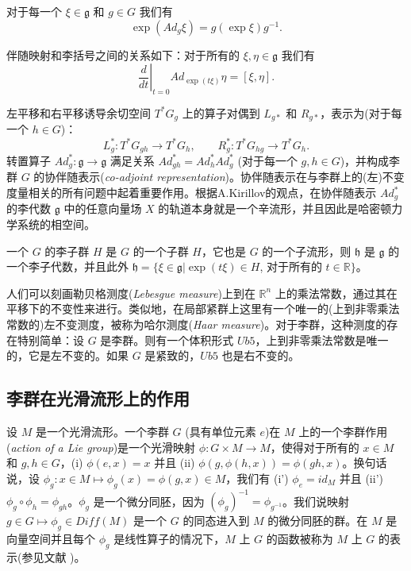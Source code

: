 \documentclass[11pt,fontset=founder]{ctexart}
\begin{document}
对于每一个 $\xi \in \mathfrak{g}$ 和 $g\in G$ 我们有
\begin{equation*}
\exp \left( Ad_{g}\xi \right) =g\left( \exp \xi \right) g^{-1}.
\end{equation*}

伴随映射和李括号之间的关系如下：对于所有的 $\xi ,\eta \in \mathfrak{g}$ 我们有
\begin{equation*}
\left. \frac{d}{dt}\right| _{t=0}Ad_{\exp (t\xi )}\eta =[\xi ,\eta ].
\end{equation*}

左平移和右平移诱导余切空间 $T^{\ast}G_{g}$ 上的算子对偶到 $L_{g\ast }$ 和 $R_{g\ast }$，表示为(对于每一个 $h\in G $)：%
\begin{equation*}
L_{g}^{\ast }:T^{\ast }G_{gh}\rightarrow T^{\ast }G_{h},\qquad R_{g}^{\ast
}:T^{\ast }G_{hg}\rightarrow T^{\ast }G_{h}.
\end{equation*}%
转置算子 $Ad_{g}^{\ast }:\mathfrak{g}\rightarrow \mathfrak{g}$ 满足关系 $Ad_{gh}^{\ast }=Ad_{h}^{\ast }Ad_{g}^{\ast }$ (对于每一个 $g,h\in G$)，并构成李群 $G$ 的协伴随表示(\textit{co-adjoint representation})。协伴随表示在与李群上的(左)不变度量相关的所有问题中起着重要作用。根据A.Kirillov的观点，在协伴随表示 $Ad_{g}^{\ast }$ 的李代数 $\mathfrak{g}$ 中的任意向量场 $X$ 的轨道本身就是一个辛流形，并且因此是哈密顿力学系统的相空间。

一个 $G$ 的李子群 $H$ 是 $G$ 的一个子群 $H$，它也是 $G$ 的一个子流形，则 $\mathfrak{h}$ 是 $\mathfrak{g}$ 的一个李子代数，并且此外 $\mathfrak{h}=\{\xi \in \mathfrak{g}|\exp (t\xi )\in H$, 对于所有的 $t\in \mathbb{R}\}$。

人们可以刻画勒贝格测度(\textit{Lebesgue measure})上到在 $\mathbb{R}^{n}$ 上的乘法常数，通过其在平移下的不变性来进行。类似地，在局部紧群上这里有一个唯一的(上到非零乘法常数的)左不变测度，被称为哈尔测度(\textit{Haar measure})。对于李群，这种测度的存在特别简单：设 $G$ 是李群。则有一个体积形式 $U{b5}$，上到非零乘法常数是唯一的，它是左不变的。如果 $G$ 是紧致的，$U{b5}$ 也是右不变的。

\subsection{李群在光滑流形上的作用}

设 $M$ 是一个光滑流形。一个李群 $G$ (具有单位元素 $e$)在 $M$ 上的一个李群作用(\textit{action of a Lie group})是一个光滑映射 $\phi :G\times M\rightarrow M$，使得对于所有的 $x\in M$ 和 $g,h\in G$，(i) $\phi (e,x)=x$ 并且 (ii) $\phi\left( g,\phi (h,x)\right) =\phi (gh,x)$。换句话说，设 $\phi _{g}:x\in M\mapsto \phi _{g}(x)=\phi (g,x)\in M$，我们有 (i') $\phi _{e}=id_{M}$ 并且 (ii') $\phi _{g}\circ \phi _{h}=\phi _{gh}$。$\phi _{g}$ 是一个微分同胚，因为 $(\phi _{g})^{-1}=\phi _{g^{-1}}$。我们说映射 $g\in G\mapsto \phi _{g}\in Diff(M)$ 是一个 $G$ 的同态进入到 $M$ 的微分同胚的群。在 $M$ 是向量空间并且每个 $\phi _{g}$ 是线性算子的情况下，$M$ 上 $G$ 的函数被称为 $M$ 上 $G$ 的表示(参见文献 \cite{Arnold,Abraham,GaneshSprBig,GaneshADG})。
\end{document}
